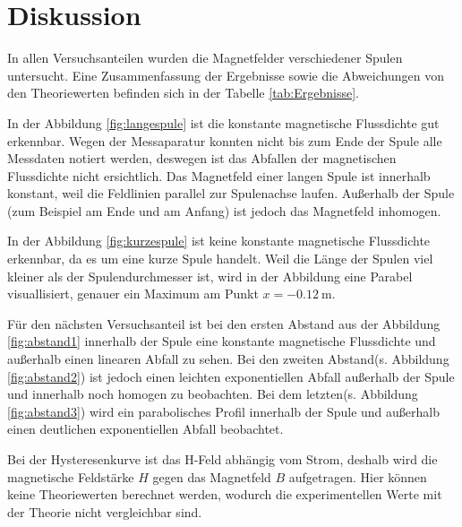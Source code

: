 \section{Diskussion}
\label{sec:Diskussion}
In allen Versuchsanteilen wurden die Magnetfelder verschiedener Spulen untersucht. Eine Zusammenfassung der Ergebnisse sowie die Abweichungen von den Theoriewerten befinden sich in der Tabelle \ref{tab:Ergebnisse}.

In der Abbildung \ref{fig:langespule} ist die konstante magnetische Flussdichte gut erkennbar. Wegen der Messaparatur konnten nicht bis zum Ende der Spule alle Messdaten notiert werden, deswegen ist das Abfallen der magnetischen Flussdichte nicht ersichtlich. Das Magnetfeld einer langen Spule ist innerhalb konstant, weil die Feldlinien parallel zur Spulenachse laufen. Außerhalb der Spule (zum Beispiel am Ende und am Anfang) ist jedoch das Magnetfeld inhomogen.

In der Abbildung \ref{fig:kurzespule} ist keine konstante magnetische Flussdichte erkennbar, da es um eine kurze Spule handelt. Weil die Länge der Spulen viel kleiner als der Spulendurchmesser ist, wird in der Abbildung eine Parabel visuallisiert, genauer ein Maximum am Punkt $ x = \SI{-0,12}{\meter}$. 

Für den nächsten Versuchsanteil ist bei den ersten Abstand aus der Abbildung \ref{fig:abstand1} innerhalb der Spule eine konstante magnetische Flussdichte und außerhalb einen linearen Abfall zu sehen. Bei den zweiten Abstand(s. Abbildung \ref{fig:abstand2}) ist jedoch einen leichten exponentiellen Abfall außerhalb der Spule und innerhalb noch homogen zu beobachten. Bei dem letzten(s. Abbildung \ref{fig:abstand3}) wird ein parabolisches Profil innerhalb der Spule und außerhalb einen deutlichen exponentiellen Abfall beobachtet.

Bei der Hysteresenkurve ist das H-Feld abhängig vom Strom, deshalb wird die magnetische Feldstärke $H$ gegen das Magnetfeld $B$ aufgetragen. Hier können keine Theoriewerten berechnet werden, wodurch die experimentellen Werte mit der Theorie nicht vergleichbar sind.

